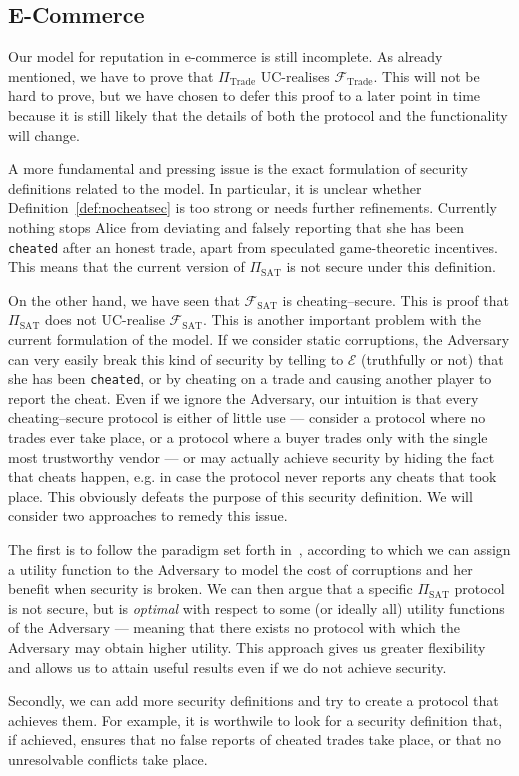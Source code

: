 \subsection{E-Commerce}
  Our model for reputation in e-commerce is still incomplete. As already mentioned, we
  have to prove that $\Pi_{\mathrm{Trade}}$ UC-realises $\mathcal{F}_{\mathrm{Trade}}$.
  This will not be hard to prove, but we have chosen to defer this proof to a later point
  in time because it is still likely that the details of both the protocol and the
  functionality will change.

  A more fundamental and pressing issue is the exact formulation of security definitions
  related to the model. In particular, it is unclear whether
  Definition~\ref{def:nocheatsec} is too strong or needs further refinements. Currently
  nothing stops Alice from deviating and falsely reporting that she has been
  \texttt{cheated} after an honest trade, apart from speculated game-theoretic incentives.
  This means that the current version of $\Pi_{\mathrm{SAT}}$ is not secure under this
  definition.

  On the other hand, we have seen that $\mathcal{F}_{\mathrm{SAT}}$ is cheating--secure.
  This is proof that $\Pi_{\mathrm{SAT}}$ does not UC-realise
  $\mathcal{F}_{\mathrm{SAT}}$. This is another important problem with the current
  formulation of the model. If we consider static corruptions, the Adversary can very
  easily break this kind of security by telling to $\mathcal{E}$ (truthfully or not) that
  she has been \texttt{cheated}, or by cheating on a trade and causing another player to
  report the cheat. Even if we ignore the Adversary, our intuition is that every
  cheating--secure protocol is either of little use --- consider a protocol where no
  trades ever take place, or a protocol where a buyer trades only with the single most
  trustworthy vendor --- or may actually achieve security by hiding the fact that cheats
  happen, e.g. in case the protocol never reports any cheats that took place. This
  obviously defeats the purpose of this security definition. We will consider two
  approaches to remedy this issue.

  The first is to follow the paradigm set forth in~\cite{rationalprotocol}, according to
  which we can assign a utility function to the Adversary to model the cost of corruptions
  and her benefit when security is broken. We can then argue that a specific
  $\Pi_{\mathrm{SAT}}$ protocol is not secure, but is \textit{optimal} with respect to
  some (or ideally all) utility functions of the Adversary --- meaning that there exists
  no protocol with which the Adversary may obtain higher utility. This approach gives us
  greater flexibility and allows us to attain useful results even if we do not achieve
  security.

  Secondly, we can add more security definitions and try to create a protocol that
  achieves them. For example, it is worthwile to look for a security definition that, if
  achieved, ensures that no false reports of cheated trades take place, or that no
  unresolvable conflicts take place.
